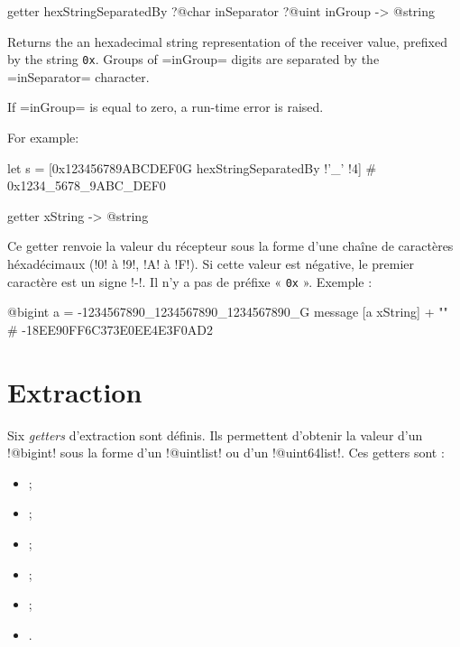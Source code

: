 
\begin{galgasbox}
getter hexStringSeparatedBy ?@char inSeparator ?@uint inGroup -> @string
\end{galgasbox}

Returns the an hexadecimal string representation of the receiver value, prefixed by the string \texttt{0x}. Groups of \ggs=inGroup= digits are separated by the \ggs=inSeparator= character.

If \ggs=inGroup= is equal to zero, a run-time error is raised.

For example:
\begin{galgas}
let s = [0x123456789ABCDEF0G hexStringSeparatedBy !'_' !4] # 0x1234_5678_9ABC_DEF0
\end{galgas}







\begin{galgasbox}
getter xString -> @string
\end{galgasbox}

Ce getter renvoie la valeur du récepteur sous la forme d'une chaîne de caractères héxadécimaux (\ggs!0! à \ggs!9!, \ggs!A! à \ggs!F!). Si cette valeur est négative, le premier caractère est un signe \ggs!-!. Il n'y a pas de préfixe « \texttt{0x} ». Exemple :

\begin{galgas}
@bigint a = -1234567890_1234567890_1234567890_G
message [a xString] + "\n" # -18EE90FF6C373E0EE4E3F0AD2
\end{galgas}









\section{Extraction}

Six \emph{getters} d'extraction sont définis. Ils permettent d'obtenir la valeur d'un \ggs!@bigint! sous la forme d'un \ggs!@uintlist! ou d'un \ggs!@uint64list!. Ces getters sont :
\begin{itemize}
  \item {} ;
  \item {} ;
  \item {} ;
  \item {} ;
  \item {} ;
  \item {}.
\end{itemize}

